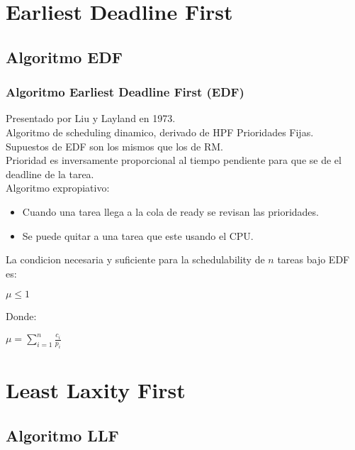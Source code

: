 \documentclass[xcolor=table]{beamer}
\begin{document}

\section{Earliest Deadline First}

\subsection{Algoritmo EDF}

\begin{frame} 
\frametitle{Algoritmo Earliest Deadline First (EDF)} 

Presentado por Liu y Layland en 1973. \\
Algoritmo de scheduling dinamico, derivado de HPF Prioridades Fijas. \\
Supuestos de EDF son los mismos que los de RM. \\
Prioridad es inversamente proporcional al tiempo pendiente para que se de el deadline de la tarea. \\
Algoritmo expropiativo:
\begin{itemize}
\item Cuando una tarea llega a la cola de ready se revisan las prioridades.
\item Se puede quitar a una tarea que este usando el CPU.
\end{itemize} 


La condicion necesaria y suficiente para la schedulability de $n$ tareas bajo EDF es:
\begin{center}
$\mu \leq 1$
\end{center}

Donde:
\begin{center}
$\mu = \sum_{i=1}^{n}\frac{c_i}{p_i}$
\end{center}

\end{frame}


\section{Least Laxity First}

\subsection{Algoritmo LLF}
\end{document}
